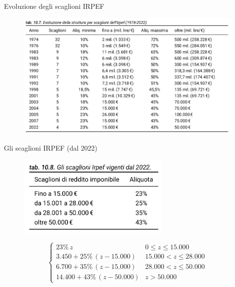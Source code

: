 \documentclass[aspectratio=64,12pt]{beamer}
\newcommand\€{\,\text{€}}
\begin{document}
\begin{frame}{Evoluzione degli scaglioni IRPEF}
\begin{figure}
\centering
\includegraphics[width=\linewidth]{./figure/evoluzione-scaglioni-IRPEF.png}
\end{figure}
\end{frame}


\begin{frame}{Gli scaglioni IRPEF (dal 2022)}
\begin{figure}
\centering
\includegraphics[height=4cm]{./figure/scaglioni-IRPEF-2022.png}
\end{figure}

\begin{equation*}
    \begin{cases}
    23\%\,z & 0\le z\le15.000\\
    3.450 + 25\%\,(z-15.000) & 15.000<z\le28.000\\
    6.700 + 35\%\,(z-15.000) & 28.000<z\le50.000\\
    14.400 + 43\%\,(z-50.000) & z > 50.000
  \end{cases}
\end{equation*}

\end{frame}
\end{document}
